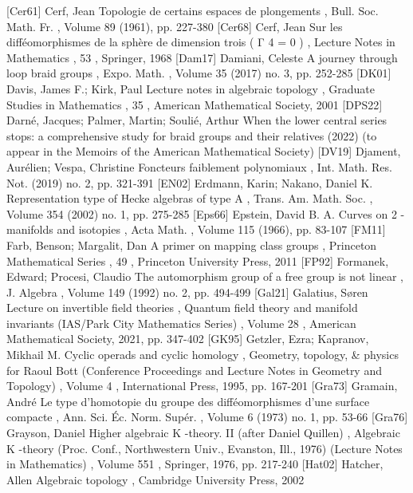  [Cer61] Cerf, Jean Topologie de certains espaces de plongements , Bull. Soc. Math. Fr. , Volume 89 (1961), pp. 227-380
 [Cer68] Cerf, Jean Sur les difféomorphismes de la sphère de dimension trois ( Γ 4 = 0 ) , Lecture Notes in Mathematics , 53 , Springer, 1968
 [Dam17] Damiani, Celeste A journey through loop braid groups , Expo. Math. , Volume 35 (2017) no. 3, pp. 252-285
 [DK01] Davis, James F.; Kirk, Paul Lecture notes in algebraic topology , Graduate Studies in Mathematics , 35 , American Mathematical Society, 2001
 [DPS22] Darné, Jacques; Palmer, Martin; Soulié, Arthur When the lower central series stops: a comprehensive study for braid groups and their relatives (2022) (to appear in the Memoirs of the American Mathematical Society)
 [DV19] Djament, Aurélien; Vespa, Christine Foncteurs faiblement polynomiaux , Int. Math. Res. Not. (2019) no. 2, pp. 321-391
 [EN02] Erdmann, Karin; Nakano, Daniel K. Representation type of Hecke algebras of type A , Trans. Am. Math. Soc. , Volume 354 (2002) no. 1, pp. 275-285
 [Eps66] Epstein, David B. A. Curves on 2 -manifolds and isotopies , Acta Math. , Volume 115 (1966), pp. 83-107
 [FM11] Farb, Benson; Margalit, Dan A primer on mapping class groups , Princeton Mathematical Series , 49 , Princeton University Press, 2011
 [FP92] Formanek, Edward; Procesi, Claudio The automorphism group of a free group is not linear , J. Algebra , Volume 149 (1992) no. 2, pp. 494-499
 [Gal21] Galatius, Søren Lecture on invertible field theories , Quantum field theory and manifold invariants (IAS/Park City Mathematics Series) , Volume 28 , American Mathematical Society, 2021, pp. 347-402
 [GK95] Getzler, Ezra; Kapranov, Mikhail M. Cyclic operads and cyclic homology , Geometry, topology, \& physics for Raoul Bott (Conference Proceedings and Lecture Notes in Geometry and Topology) , Volume 4 , International Press, 1995, pp. 167-201
 [Gra73] Gramain, André Le type d’homotopie du groupe des difféomorphismes d’une surface compacte , Ann. Sci. Éc. Norm. Supér. , Volume 6 (1973) no. 1, pp. 53-66
 [Gra76] Grayson, Daniel Higher algebraic K -theory. II (after Daniel Quillen) , Algebraic K -theory (Proc. Conf., Northwestern Univ., Evanston, Ill., 1976) (Lecture Notes in Mathematics) , Volume 551 , Springer, 1976, pp. 217-240
 [Hat02] Hatcher, Allen Algebraic topology , Cambridge University Press, 2002
